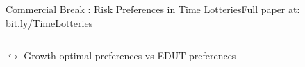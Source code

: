 \begin{frame}{Commercial Break : Risk Preferences in Time Lotteries}{Full paper at: \url{bit.ly/TimeLotteries}}
\begin{columns}[T]
\end{columns}
\vspace{1em}
\bc
$\hookrightarrow$ Growth-optimal preferences vs EDUT preferences
\ec

\end{frame}